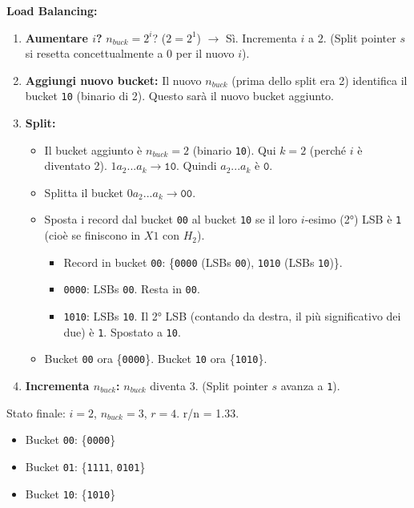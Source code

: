 \textbf{Load Balancing:}
\begin{enumerate}
    \item \textbf{Aumentare $i$?} $n_{buck} = 2^i$? ($2 = 2^1$) $\rightarrow$ Sì. Incrementa $i$ a $2$. (Split pointer $s$ si resetta concettualmente a 0 per il nuovo $i$).
    \item \textbf{Aggiungi nuovo bucket:} Il nuovo $n_{buck}$ (prima dello split era 2) identifica il bucket \texttt{10} (binario di 2). Questo sarà il nuovo bucket aggiunto.
    \item \textbf{Split:}
    \begin{itemize}
        \item Il bucket aggiunto è $n_{buck} = 2$ (binario \texttt{10}). Qui $k=2$ (perché $i$ è diventato 2). $1a_2...a_k \rightarrow \texttt{10}$. Quindi $a_2...a_k$ è $\texttt{0}$.
        \item Splitta il bucket $0a_2...a_k \rightarrow \texttt{00}$.
        \item Sposta i record dal bucket \texttt{00} al bucket \texttt{10} se il loro $i$-esimo (2°) LSB è \texttt{1} (cioè se finiscono in $X1$ con $H_2$).
        \begin{itemize}
            \item Record in bucket \texttt{00}: \{\texttt{0000} (LSBs \texttt{00}), \texttt{1010} (LSBs \texttt{10})\}.
            \item \texttt{0000}: LSBs \texttt{00}. Resta in \texttt{00}.
            \item \texttt{1010}: LSBs \texttt{10}. Il 2° LSB (contando da destra, il più significativo dei due) è \texttt{1}. Spostato a \texttt{10}.
        \end{itemize}
        \item Bucket \texttt{00} ora \{\texttt{0000}\}. Bucket \texttt{10} ora \{\texttt{1010}\}.
    \end{itemize}
    \item \textbf{Incrementa $n_{buck}$:} $n_{buck}$ diventa $3$. (Split pointer $s$ avanza a \texttt{1}).
\end{enumerate}
Stato finale: $i=2$, $n_{buck}=3$, $r=4$. r/n = 1.33.
\begin{itemize}
    \item Bucket \texttt{00}: \{\texttt{0000}\}
    \item Bucket \texttt{01}: \{\texttt{1111}, \texttt{0101}\}
    \item Bucket \texttt{10}: \{\texttt{1010}\}
\end{itemize}

